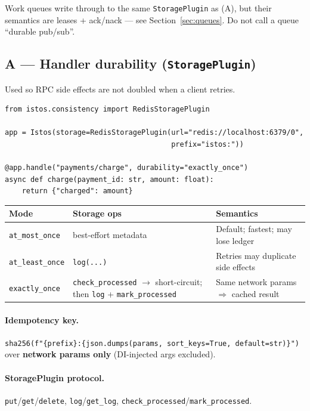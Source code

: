 \documentclass[11pt,a4paper]{article}
\begin{document}
\begin{keybox}
Work queues write through to the same \texttt{StoragePlugin} as (A), but their
semantics are leases + ack/nack --- see Section~\ref{sec:queues}. Do not call a
queue ``durable pub/sub''.
\end{keybox}

\subsection{A --- Handler durability (\texttt{StoragePlugin})}

Used so RPC side effects are not doubled when a client retries.

\begin{lstlisting}
from istos.consistency import RedisStoragePlugin

app = Istos(storage=RedisStoragePlugin(url="redis://localhost:6379/0",
                                       prefix="istos:"))

@app.handle("payments/charge", durability="exactly_once")
async def charge(payment_id: str, amount: float):
    return {"charged": amount}
\end{lstlisting}

\begin{center}
\begin{tabular}{@{}p{}p{}p{}@{}}
\toprule
Mode & Storage ops & Semantics \\
\midrule
\texttt{at\_most\_once} & best-effort metadata & Default; fastest; may lose ledger \\
\texttt{at\_least\_once} & \texttt{log(...)} & Retries may duplicate side effects \\
\texttt{exactly\_once} & \texttt{check\_processed} $\to$ short-circuit;
  then \texttt{log} + \texttt{mark\_processed} & Same network params $\Rightarrow$
  cached result \\
\bottomrule
\end{tabular}
\end{center}

\paragraph{Idempotency key.}
\texttt{sha256(f"\{prefix\}:\{json.dumps(params, sort\_keys=True, default=str)\}")}
over \textbf{network params only} (DI-injected args excluded).

\paragraph{StoragePlugin protocol.}
\texttt{put}/\texttt{get}/\texttt{delete}, \texttt{log}/\texttt{get\_log},
\texttt{check\_processed}/\texttt{mark\_processed}.
\end{document}
